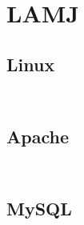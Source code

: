 \begin{lstlisting}[language=bash]

\end{lstlisting}




\begin{lstlisting}[language=bash]

\end{lstlisting}




\begin{lstlisting}[language=bash]

\end{lstlisting}

\chapter{LAMJ}



\section{Linux}



\begin{lstlisting}[language=bash]

\end{lstlisting}





\begin{lstlisting}[language=bash]

\end{lstlisting}

\section{Apache}


\begin{lstlisting}[language=bash]

\end{lstlisting}




\begin{lstlisting}[language=bash]

\end{lstlisting}


\section{MySQL}


